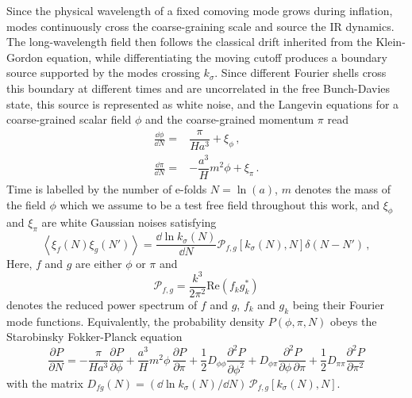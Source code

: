 \documentclass{article}
\numberwithin{equation}{section}
\begin{document}
	Since the physical wavelength of a fixed comoving mode grows during inflation, modes continuously cross the coarse-graining scale and source the IR dynamics. The long-wavelength field then follows the classical drift inherited from the Klein-Gordon equation, while differentiating the moving cutoff produces a boundary source supported by the modes crossing \(k_\sigma\). Since different Fourier shells cross this boundary at different times and are uncorrelated in the free Bunch-Davies state, this source is represented as white noise, and the Langevin equations for a coarse-grained scalar field $\phi$ and the coarse-grained momentum $\pi$ read~\cite{grain2017stochastic, vennin2025quantum}
    \begin{align}
    \label{eq:Lang:Staro:phi}
        \frac{\dd\phi}{\dd N}=& \dfrac{\pi}{Ha^3} +\xi_\phi\, ,\\
        \frac{\dd\pi}{\dd N}= & -\dfrac{a^3}{H}m^2\phi+\xi_\pi\, .
    \label{eq:Lang:Staro:pi}
\end{align}
    Time is labelled by the number of e-folds $N=\ln(a)$, $m$ denotes the mass of the field $\phi$ which we assume to be a test free field throughout this work, and $\xi_\phi$ and $\xi_\pi$ are white Gaussian noises satisfying
    \begin{equation}
        \left\langle \xi_f (N) \xi_g(N')\right\rangle=\frac{\dd \ln k_\sigma(N)}{\dd N} \mathcal{P}_{f,g}\left[k_\sigma(N),N\right]\delta(N-N')\, ,
    \end{equation}
Here, $f$ and $g$ are either $\phi$ or $\pi$ and \begin{equation}
\mathcal{P}_{f,g}=\frac{k^3}{2\pi^2} \mathrm{Re}\left(f_k g_k^*\right)
\end{equation}
denotes the reduced power spectrum of $f$ and $g$,  $f_k$ and $g_k$ being their Fourier mode functions. Equivalently, the probability density $P(\phi,\pi,N)$ obeys the Starobinsky Fokker-Planck equation
\begin{equation}
\label{eq:Staro:FP:2d}
\frac{\partial P}{\partial N} =
-\frac{\pi}{Ha^3}\frac{\partial P}{\partial \phi}
+\frac{a^3}{H}m^2\phi\,\frac{\partial P}{\partial \pi}
+\frac12 D_{\phi\phi}\frac{\partial^2 P}{\partial \phi^2}
+D_{\phi\pi}\frac{\partial^2 P}{\partial \phi\,\partial \pi}
+\frac12 D_{\pi\pi}\frac{\partial^2 P}{\partial \pi^2}
\end{equation}
with the matrix $D_{fg}(N)=(\dd \ln k_\sigma(N)/\dd N)\, \mathcal{P}_{f,g}[k_\sigma(N),N]$.
\end{document}
